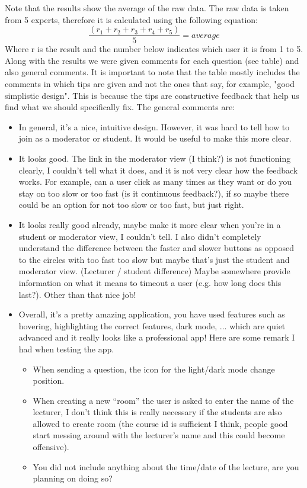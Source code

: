 \documentclass{article}
\begin{document}
    Note that the results show the average of the raw data. The raw data is taken from 5 experts, therefore it is calculated using the following equation:
    \[ \frac{(r_1 + r_2 + r_3 + r_4 + r_5)}{5} = average \]
    Where r is the result and the number below indicates which user it is from 1 to 5.
    \\

    Along with the results we were given comments for each question (see table) and also general comments. It is important to note that the table mostly includes the comments in which tips are given and not the ones that say, for example, "good simplistic design". This is because the tips are constructive feedback that help us find what we should specifically fix. The general comments are:
    \begin{itemize}
        \item In general, it’s a nice, intuitive design. However, it was hard to tell how to join as a moderator or student. It would be useful to make this more clear.
        \item It looks good. The link in the moderator view (I think?) is not functioning clearly, I couldn't tell what it does, and it is not very clear how the feedback works. For example, can a user click as many times as they want or do you stay on too slow or too fast (is it continuous feedback?), if so maybe there could be an option for not too slow or too fast, but just right.
        \item It looks really good already, maybe make it more clear when you’re in a student or moderator view, I couldn’t tell. I also didn’t completely understand the difference between the faster and slower buttons as opposed to the circles with too fast too slow but maybe that’s just the student and moderator view. (Lecturer / student difference) Maybe somewhere provide information on what it means to timeout a user (e.g. how long does this last?). Other than that nice job!
        \item Overall, it’s a pretty amazing application, you have used features such as hovering, highlighting the correct features, dark mode, ... which are quiet advanced and it really looks like a professional app! Here are some remark I had when testing the app.
        \begin{itemize}
            \item When sending a question, the icon for the light/dark mode change position.
            \item When creating a new “room” the user is asked to enter the name of the lecturer, I don’t think this is really necessary if the students are also allowed to create room (the course id is sufficient I think, people good start messing around with the lecturer’s name and this could become offensive).
            \item You did not include anything about the time/date of the lecture, are you planning on doing so?
        \end{itemize}
    \end{itemize}
\end{document}
